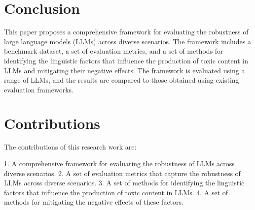 \documentclass{article}
\begin{document}
\section{Conclusion}

This paper proposes a comprehensive framework for evaluating the robustness of large language models (LLMs) across diverse scenarios. The framework includes a benchmark dataset, a set of evaluation metrics, and a set of methods for identifying the linguistic factors that influence the production of toxic content in LLMs and mitigating their negative effects. The framework is evaluated using a range of LLMs, and the results are compared to those obtained using existing evaluation frameworks.

\section{Contributions}

The contributions of this research work are:

1.  A comprehensive framework for evaluating the robustness of LLMs across diverse scenarios.
2.  A set of evaluation metrics that capture the robustness of LLMs across diverse scenarios.
3.  A set of methods for identifying the linguistic factors that influence the production of toxic content in LLMs.
4.  A set of methods for mitigating the negative effects of these factors.
\end{document}
